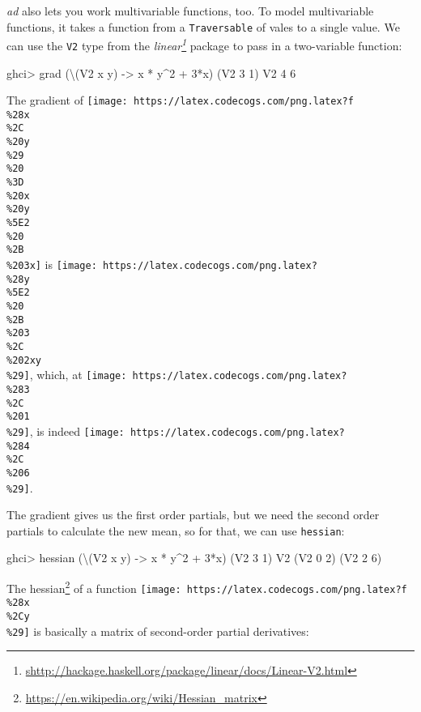 \documentclass[]{article}
\newenvironment{Shaded}{}{}
\newcommand{\DataTypeTok}[1]{\textcolor[rgb]{0.56,0.13,0.00}{#1}}
\newcommand{\DecValTok}[1]{\textcolor[rgb]{0.25,0.63,0.44}{#1}}
\newcommand{\FunctionTok}[1]{\textcolor[rgb]{0.02,0.16,0.49}{#1}}
\newcommand{\NormalTok}[1]{#1}
\newcommand{\OtherTok}[1]{\textcolor[rgb]{0.00,0.44,0.13}{#1}}
\renewcommand{\href}[2]{#2\footnote{\url{#1}}}
\begin{document}
\emph{ad} also lets you work multivariable functions, too. To model
multivariable functions, it takes a function from a \texttt{Traversable} of
vales to a single value. We can use the \texttt{V2} type from the
\emph{\href{shttp://hackage.haskell.org/package/linear/docs/Linear-V2.html}{linear}}
package to pass in a two-variable function:

\begin{Shaded}
\begin{Highlighting}[]
\NormalTok{ghci}\FunctionTok{>}\NormalTok{ grad (\textbackslash{}(}\DataTypeTok{V2}\NormalTok{ x y) }\OtherTok{->}\NormalTok{ x }\FunctionTok{*}\NormalTok{ y}\FunctionTok{^}\DecValTok{2} \FunctionTok{+} \DecValTok{3}\FunctionTok{*}\NormalTok{x) (}\DataTypeTok{V2} \DecValTok{3} \DecValTok{1}\NormalTok{)}
\DataTypeTok{V2} \DecValTok{4} \DecValTok{6}
\end{Highlighting}
\end{Shaded}

The gradient of
\texttt{[image: https://latex.codecogs.com/png.latex?f\\\%28x\\\%2C\\\%20y\\\%29\\\%20\\\%3D\\\%20x\\\%20y\\\%5E2\\\%20\\\%2B\\\%203x]}
is
\texttt{[image: https://latex.codecogs.com/png.latex?\\\%28y\\\%5E2\\\%20\\\%2B\\\%203\\\%2C\\\%202xy\\\%29]},
which, at
\texttt{[image: https://latex.codecogs.com/png.latex?\\\%283\\\%2C\\\%201\\\%29]}, is
indeed
\texttt{[image: https://latex.codecogs.com/png.latex?\\\%284\\\%2C\\\%206\\\%29]}.

The gradient gives us the first order partials, but we need the second order
partials to calculate the new mean, so for that, we can use \texttt{hessian}:

\begin{Shaded}
\begin{Highlighting}[]
\NormalTok{ghci}\FunctionTok{>}\NormalTok{ hessian (\textbackslash{}(}\DataTypeTok{V2}\NormalTok{ x y) }\OtherTok{->}\NormalTok{ x }\FunctionTok{*}\NormalTok{ y}\FunctionTok{^}\DecValTok{2} \FunctionTok{+} \DecValTok{3}\FunctionTok{*}\NormalTok{x) (}\DataTypeTok{V2} \DecValTok{3} \DecValTok{1}\NormalTok{)}
\DataTypeTok{V2}\NormalTok{ (}\DataTypeTok{V2} \DecValTok{0} \DecValTok{2}\NormalTok{)}
\NormalTok{   (}\DataTypeTok{V2} \DecValTok{2} \DecValTok{6}\NormalTok{)}
\end{Highlighting}
\end{Shaded}

The \href{https://en.wikipedia.org/wiki/Hessian_matrix}{hessian} of a function
\texttt{[image: https://latex.codecogs.com/png.latex?f\\\%28x\\\%2Cy\\\%29]} is
basically a matrix of second-order partial derivatives:
\end{document}
